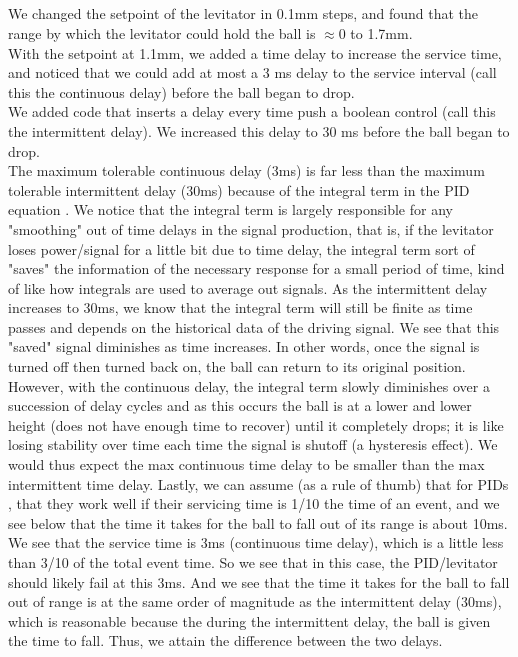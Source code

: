 \documentclass{article}
\begin{document}
\subsection{}
    We changed the setpoint of the levitator in 0.1mm steps, and found that the range by which the levitator could hold the ball is $\approx$0 to 1.7mm.\\\indent With the setpoint at 1.1mm, we added a time delay to increase the service time, and noticed that we could add at most a 3 ms delay to the service interval (call this the continuous delay) before the ball began to drop.\\\indent We added code that inserts a delay every time push a boolean control (call this the intermittent delay). We increased this delay to 30 ms before the ball began to drop.\\\indent The maximum tolerable continuous delay (3ms) is far less than the maximum tolerable intermittent delay (30ms) because of the integral term in the PID equation \cite{lab11}. We notice that the integral term is largely responsible for any "smoothing" out of time delays in the signal production, that is, if the levitator loses power/signal for a little bit due to time delay, the integral term sort of "saves" the information of the necessary response for a small period of time, kind of like how integrals are used to average out signals. As the intermittent delay increases to 30ms, we know that the integral term will still be finite as time passes and depends on the historical data of the driving signal. We see that this "saved" signal diminishes as time increases. In other words, once the signal is turned off then turned back on, the ball can return to its original position. However, with the continuous delay, the integral term slowly diminishes over a succession of delay cycles and as this occurs the ball is at a lower and lower height (does not have enough time to recover) until it completely drops; it is like losing stability over time each time the signal is shutoff (a hysteresis effect).  We would thus expect the max continuous time delay to be smaller than the max intermittent time delay. Lastly, we can assume (as a rule of thumb) that for PIDs \cite{lab11}, that they work well if their servicing time is 1/10 the time of an event, and we see below that the time it takes for the ball to fall out of its range is about 10ms. We see that the service time is 3ms (continuous time delay), which is a little less than 3/10 of the total event time. So we see that in this case, the PID/levitator should likely fail at this 3ms. And we see that the time it takes for the ball to fall out of range is at the same order of magnitude as the intermittent delay (30ms), which is reasonable because the during the intermittent delay, the ball is given the time to fall. Thus, we attain the difference between the two delays.
\end{document}
